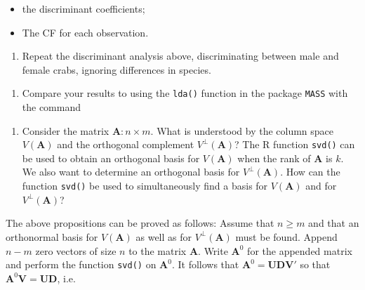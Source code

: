 \documentclass[
]{book}
\newenvironment{Shaded}{\begin{snugshade}}{\end{snugshade}}
\newcommand{\AttributeTok}[1]{\textcolor[rgb]{0.13,0.29,0.53}{#1}}
\newcommand{\FunctionTok}[1]{\textcolor[rgb]{0.13,0.29,0.53}{\textbf{#1}}}
\newcommand{\NormalTok}[1]{#1}
\newcommand{\SpecialCharTok}[1]{\textcolor[rgb]{0.81,0.36,0.00}{\textbf{#1}}}
\providecommand{\tightlist}{%
  \setlength{\itemsep}{0pt}\setlength{\parskip}{0pt}}
\begin{document}
\begin{itemize}
\item
  the discriminant coefficients;
\item
  The CF for each observation.
\end{itemize}

\begin{enumerate}
\def\labelenumi{(\alph{enumi})}
\setcounter{enumi}{21}
\tightlist
\item
  Repeat the discriminant analysis above, discriminating between male and female crabs, ignoring differences in species.
\end{enumerate}

\begin{enumerate}
\def\labelenumi{(\roman{enumi})}
\setcounter{enumi}{5}
\tightlist
\item
  Compare your results to using the \texttt{lda()} function in the package \texttt{MASS} with the command
\end{enumerate}

\begin{Shaded}
\end{Shaded}

\begin{enumerate}
\def\labelenumi{\arabic{enumi}.}
\setcounter{enumi}{7}
\tightlist
\item
  Consider the matrix \(\mathbf{A}:n \times m\). What is understood by the column space \(V(\mathbf{A})\) and the orthogonal complement \(V^⊥(\mathbf{A})\)? The R function \texttt{svd()} can be used to obtain an orthogonal basis for \(V(\mathbf{A})\) when the rank of \(\mathbf{A}\) is \(k\). We also want to determine an orthogonal basis for \(V^⊥(\mathbf{A})\). How can the function \texttt{svd()} be used to simultaneously find a basis for \(V(\mathbf{A})\) and for \(V^⊥(\mathbf{A})\)?
\end{enumerate}

The above propositions can be proved as follows: Assume that \(n≥m\) and that an orthonormal basis for \(V(\mathbf{A})\) as well as for \(V^⊥(\mathbf{A})\) must be found. Append \(n-m\) zero vectors of size \(n\) to the matrix \(\mathbf{A}\). Write \(\mathbf{A}^0\) for the appended matrix and perform the function \texttt{svd()} on \(\mathbf{A}^0\). It follows that \(\mathbf{A}^0 = \mathbf{UDV}'\) so that \(\mathbf{A}^0 \mathbf{V} = \mathbf{UD}\), i.e.~
\end{document}
